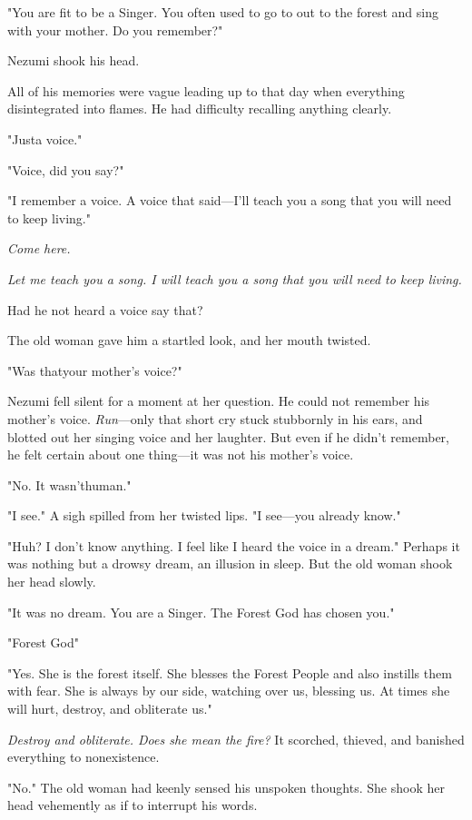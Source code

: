 "You are fit to be a Singer. You often used to go to out to the forest
and sing with your mother. Do you remember?"

Nezumi shook his head.

All of his memories were vague leading up to that day when everything
disintegrated into flames. He had difficulty recalling anything clearly.

"Just\el a voice."

"Voice, did you say?"

"I remember a voice. A voice that said---I'll teach you a song that you
will need to keep living."

\emph{Come here.}

\emph{Let me teach you a song. I will teach you a song that you will need to
keep living.}

Had he not heard a voice say that?

The old woman gave him a startled look, and her mouth twisted.

"Was that\el your mother's voice?"

Nezumi fell silent for a moment at her question. He could not remember
his mother's voice. \emph{Run}---only that short cry stuck stubbornly in his
ears, and blotted out her singing voice and her laughter. But even if he
didn't remember, he felt certain about one thing---it was not his mother's
voice.

"No. It wasn't\el human."

"\el I see." A sigh spilled from her twisted lips. "I see---you
already know."

"Huh? I don't know anything. I feel like I heard the voice in a dream."
Perhaps it was nothing but a drowsy dream, an illusion in sleep. But the
old woman shook her head slowly.

"It was no dream. You are a Singer. The Forest God has chosen you."

"Forest God\el "

"Yes. She is the forest itself. She blesses the Forest People and also
instills them with fear. She is always by our side, watching over us,
blessing us. At times she will hurt, destroy, and obliterate us."

\emph{Destroy and obliterate. Does she mean the fire?} It scorched, thieved,
and banished everything to nonexistence.

"No." The old woman had keenly sensed his unspoken thoughts. She shook
her head vehemently as if to interrupt his words.

